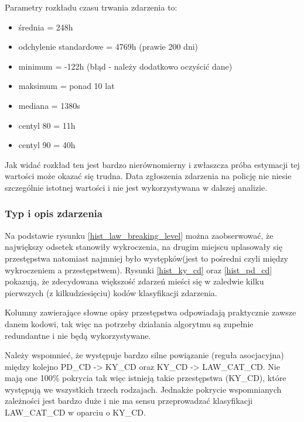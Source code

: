 \documentclass{classrep}
\begin{document}
{{{                Parametry rozkładu czasu trwania zdarzenia to:
                \begin{itemize}
                    \item średnia = 248h
                    \item odchylenie standardowe = 4769h (prawie 200 dni)
                    \item minimum = -122h (błąd - należy dodatkowo oczyścić dane)
                    \item maksimum = ponad 10 lat
                    \item mediana = 1380s
                    \item centyl 80 = 11h
                    \item centyl 90 = 40h
                \end{itemize}
                Jak widać rozkład ten jest bardzo nierównomierny i zwłaszcza próba estymacji tej wartości może okazać się trudna. Data zgłoszenia zdarzenia na policję nie niesie szczególnie istotnej wartości i nie jest wykorzystywana w dalszej analizie.
            }

            \subsubsection{Typ i opis zdarzenia} {
                Na podstawie rysunku \ref{hist_law_breaking_level} można zaobserwować,
                że największy odsetek stanowiły wykroczenia, na drugim miejscu
                uplasowały się przestępstwa natomiast najmniej było występków(jest to
                pośredni czyli między wykroczeniem a przestępstwem). Rysunki \ref{hist_ky_cd} oraz \ref{hist_pd_cd} pokazują, że zdecydowana większość zdarzeń mieści się w zaledwie kilku pierwszych (z kilkudziesięciu) kodów klasyfikacji zdarzenia.
                
                Kolumny zawierające słowne opisy przestępstwa odpowiadają praktycznie zawsze danem kodowi, tak więc na potrzeby działania algorytmu są zupełnie redundantne i nie będą wykorzystywane.
                
                Należy wspomnieć, że występuje bardzo silne powiązanie (reguła asocjacyjna) między kolejno PD\_CD -> KY\_CD oraz KY\_CD -> LAW\_CAT\_CD. Nie mają one 100\% pokrycia tak więc istnieją takie przestępstwa (KY\_CD), które występują we wszystkich trzech rodzajach. Jednakże pokrycie wspomnianych zależności jest bardzo duże i nie ma sensu przeprowadzać klasyfikacji LAW\_CAT\_CD w oparciu o KY\_CD.
                
}}}
\end{document}

